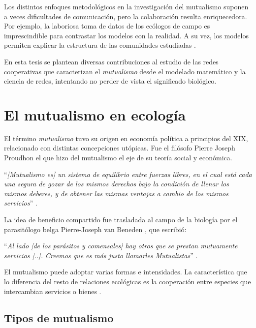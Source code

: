 Los distintos enfoques metodológicos en la investigación del mutualismo suponen a veces dificultades de comunicación, pero la colaboración resulta enriquecedora. Por ejemplo, la laboriosa toma de datos de los ecólogos de campo es imprescindible para contrastar los modelos con la realidad. A su vez, los modelos permiten explicar la estructura de las comunidades estudiadas \cite{ballantyne2015constructing}.

En esta tesis se plantean diversas contribuciones al estudio de las redes cooperativas que  caracterizan el \textit{mutualismo} desde el modelado matemático y la ciencia de redes, intentando no perder de vista el significado biológico.

\section{El mutualismo en ecología}

El término \textit{mutualismo} tuvo su origen en economía política a principios del XIX, relacionado con distintas concepciones utópicas. Fue el filósofo Pierre Joseph Proudhon el que hizo del mutualismo el eje de su teoría social y económica.

\enquote{\itshape [Mutualismo es] un sistema de equilibrio entre fuerzas libres, en el cual está cada una segura de gozar de los mismos derechos bajo la condición de llenar los mismos deberes, y 
de obtener las mismas ventajas a cambio de los mismos servicios} \cite{proudhon1868capacite}.

La idea de beneficio compartido fue trasladada al campo de la biología por el parasitólogo belga Pierre-Joseph van Beneden \cite{boucher1982ecology}, que escribió:

\enquote{\itshape Al lado [de los parásitos y comensales] hay otros que se prestan mutuamente servicios [..]. Creemos que es más justo llamarles Mutualistas} \cite{van1878commensaux}.

El mutualismo puede adoptar varias formas e intensidades. La característica que lo diferencia del resto de relaciones ecológicas es la cooperación entre especies que intercambian servicios o bienes \cite{bronstein2001exploitation}.


\subsection{Tipos de mutualismo}
\label{TIPOS_DE_MUTUALISMO}
	
